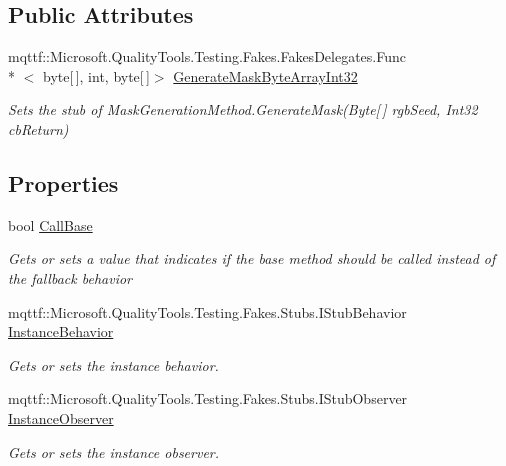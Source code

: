 \subsection*{Public Attributes}
\begin{DoxyCompactItemize}
\item 
mqttf\-::\-Microsoft.\-Quality\-Tools.\-Testing.\-Fakes.\-Fakes\-Delegates.\-Func\\*
$<$ byte\mbox{[}$\,$\mbox{]}, int, byte\mbox{[}$\,$\mbox{]}$>$ \hyperlink{class_system_1_1_security_1_1_cryptography_1_1_fakes_1_1_stub_mask_generation_method_a6a82b8c8b8eb9ac62f6c489aee636169}{Generate\-Mask\-Byte\-Array\-Int32}
\begin{DoxyCompactList}\small\item\em Sets the stub of Mask\-Generation\-Method.\-Generate\-Mask(\-Byte\mbox{[}$\,$\mbox{]} rgb\-Seed, Int32 cb\-Return)\end{DoxyCompactList}\end{DoxyCompactItemize}
\subsection*{Properties}
\begin{DoxyCompactItemize}
\item 
bool \hyperlink{class_system_1_1_security_1_1_cryptography_1_1_fakes_1_1_stub_mask_generation_method_a6ab2ae80965e073edf6b5521317cac97}{Call\-Base}
\begin{DoxyCompactList}\small\item\em Gets or sets a value that indicates if the base method should be called instead of the fallback behavior\end{DoxyCompactList}\item 
mqttf\-::\-Microsoft.\-Quality\-Tools.\-Testing.\-Fakes.\-Stubs.\-I\-Stub\-Behavior \hyperlink{class_system_1_1_security_1_1_cryptography_1_1_fakes_1_1_stub_mask_generation_method_a67986d42e9be28820b301d266c86e59c}{Instance\-Behavior}
\begin{DoxyCompactList}\small\item\em Gets or sets the instance behavior.\end{DoxyCompactList}\item 
mqttf\-::\-Microsoft.\-Quality\-Tools.\-Testing.\-Fakes.\-Stubs.\-I\-Stub\-Observer \hyperlink{class_system_1_1_security_1_1_cryptography_1_1_fakes_1_1_stub_mask_generation_method_a10193351db6282394122569c4ed8c3de}{Instance\-Observer}
\begin{DoxyCompactList}\small\item\em Gets or sets the instance observer.\end{DoxyCompactList}\end{DoxyCompactItemize}


